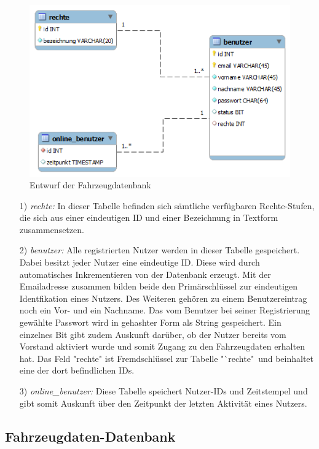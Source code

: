 \documentclass[fontsize = 12pt, paper = a4]{scrreprt}
\begin{document}
\begin{figure}[h]
\centering
\includegraphics[scale = 0.6]{nutzerdatenbank} 
\caption{Entwurf der Fahrzeugdatenbank}
\end{figure} 

\begin{itemize}
\item[1)] \textit{rechte:} 
In dieser Tabelle befinden sich sämtliche verfügbaren Rechte-Stufen, die sich aus einer eindeutigen ID und einer Bezeichnung in Textform zusammensetzen.

\item[2)] \textit{benutzer:} 
Alle registrierten Nutzer werden in dieser Tabelle gespeichert. Dabei besitzt jeder Nutzer eine eindeutige ID. Diese wird durch automatisches Inkrementieren von der Datenbank erzeugt. Mit der Emailadresse zusammen bilden beide den Primärschlüssel zur eindeutigen Identfikation eines Nutzers. Des Weiteren gehören zu einem Benutzereintrag noch ein Vor- und ein Nachname. Das vom Benutzer bei seiner Registrierung gewählte Passwort wird in gehashter Form als String gespeichert. Ein einzelnes Bit gibt zudem Auskunft darüber, ob der Nutzer bereits vom Vorstand aktiviert wurde und somit Zugang zu den Fahrzeugdaten erhalten hat. Das Feld "rechte" ist Fremdschlüssel zur Tabelle "`rechte"\ und beinhaltet eine der dort befindlichen IDs.

\item[3)] \textit{online\_benutzer:} 
Diese Tabelle speichert Nutzer-IDs und Zeitstempel und gibt somit Auskunft über den Zeitpunkt der letzten Aktivität eines Nutzers.

\end{itemize}

\subsection{Fahrzeugdaten-Datenbank}
\end{document}
